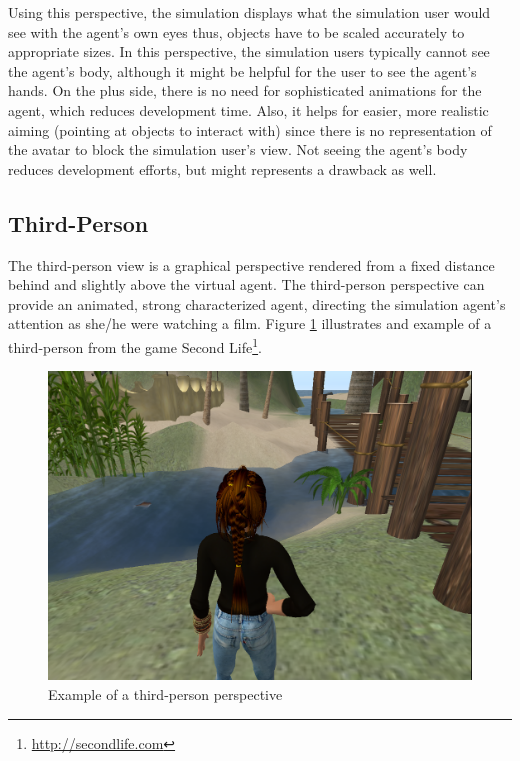 Using this perspective, the simulation displays what the simulation user would see with the agent's own eyes thus, objects have to be scaled accurately to appropriate sizes. In this perspective, the simulation users typically cannot see the agent's body, although it might be helpful for the user to see the agent's hands. On the plus side, there is no need for sophisticated animations for the agent, which reduces development time. Also, it helps for easier, more realistic aiming (pointing at objects to interact with) since there is no representation of the avatar to block the simulation user's view. Not seeing the agent's body reduces development efforts, but might represents a drawback as well.\\

\subsection{Third-Person}\label{subsec:third_person}
The third-person view is a graphical perspective rendered from a fixed distance behind and slightly above the virtual agent. The third-person perspective can provide an animated, strong characterized agent, directing the simulation agent's attention as she/he were watching a film. Figure \ref{fig:req_third_person} illustrates and example of a third-person from the game Second Life\footnote{\url{http://secondlife.com}}.
\begin{figure}[H]
	\centering
	\includegraphics[width=\linewidth]{gfx/Chapter3/third_person}
	\caption{Example of a third-person perspective}
	\label{fig:req_third_person}
\end{figure}

